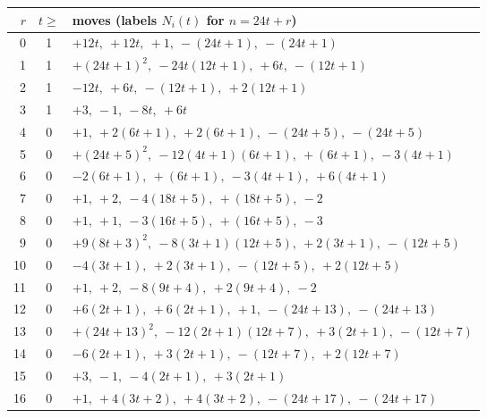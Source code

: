 {\footnotesize\begin{longtable}{@{}rcp{}@{}}\toprule $r$ & $t\ge$ & moves (labels $N_i(t)$ for $n=24t+r$)\\\midrule\endhead
0 & 1 & $+12 t,\ +12 t,\ +1,\ -\left(24 t + 1\right),\ -\left(24 t + 1\right)$ \\
1 & 1 & $+\left(24 t + 1\right)^{2},\ -24 t \left(12 t + 1\right),\ +6 t,\ -\left(12 t + 1\right)$ \\
2 & 1 & $-12 t,\ +6 t,\ -\left(12 t + 1\right),\ +2 \left(12 t + 1\right)$ \\
3 & 1 & $+3,\ -1,\ -8 t,\ +6 t$ \\
4 & 0 & $+1,\ +2 \left(6 t + 1\right),\ +2 \left(6 t + 1\right),\ -\left(24 t + 5\right),\ -\left(24 t + 5\right)$ \\
5 & 0 & $+\left(24 t + 5\right)^{2},\ -12 \left(4 t + 1\right) \left(6 t + 1\right),\ +\left(6 t + 1\right),\ -3 \left(4 t + 1\right)$ \\
6 & 0 & $-2 \left(6 t + 1\right),\ +\left(6 t + 1\right),\ -3 \left(4 t + 1\right),\ +6 \left(4 t + 1\right)$ \\
7 & 0 & $+1,\ +2,\ -4 \left(18 t + 5\right),\ +\left(18 t + 5\right),\ -2$ \\
8 & 0 & $+1,\ +1,\ -3 \left(16 t + 5\right),\ +\left(16 t + 5\right),\ -3$ \\
9 & 0 & $+9 \left(8 t + 3\right)^{2},\ -8 \left(3 t + 1\right) \left(12 t + 5\right),\ +2 \left(3 t + 1\right),\ -\left(12 t + 5\right)$ \\
10 & 0 & $-4 \left(3 t + 1\right),\ +2 \left(3 t + 1\right),\ -\left(12 t + 5\right),\ +2 \left(12 t + 5\right)$ \\
11 & 0 & $+1,\ +2,\ -8 \left(9 t + 4\right),\ +2 \left(9 t + 4\right),\ -2$ \\
12 & 0 & $+6 \left(2 t + 1\right),\ +6 \left(2 t + 1\right),\ +1,\ -\left(24 t + 13\right),\ -\left(24 t + 13\right)$ \\
13 & 0 & $+\left(24 t + 13\right)^{2},\ -12 \left(2 t + 1\right) \left(12 t + 7\right),\ +3 \left(2 t + 1\right),\ -\left(12 t + 7\right)$ \\
14 & 0 & $-6 \left(2 t + 1\right),\ +3 \left(2 t + 1\right),\ -\left(12 t + 7\right),\ +2 \left(12 t + 7\right)$ \\
15 & 0 & $+3,\ -1,\ -4 \left(2 t + 1\right),\ +3 \left(2 t + 1\right)$ \\
16 & 0 & $+1,\ +4 \left(3 t + 2\right),\ +4 \left(3 t + 2\right),\ -\left(24 t + 17\right),\ -\left(24 t + 17\right)$ \\

\end{longtable}}
